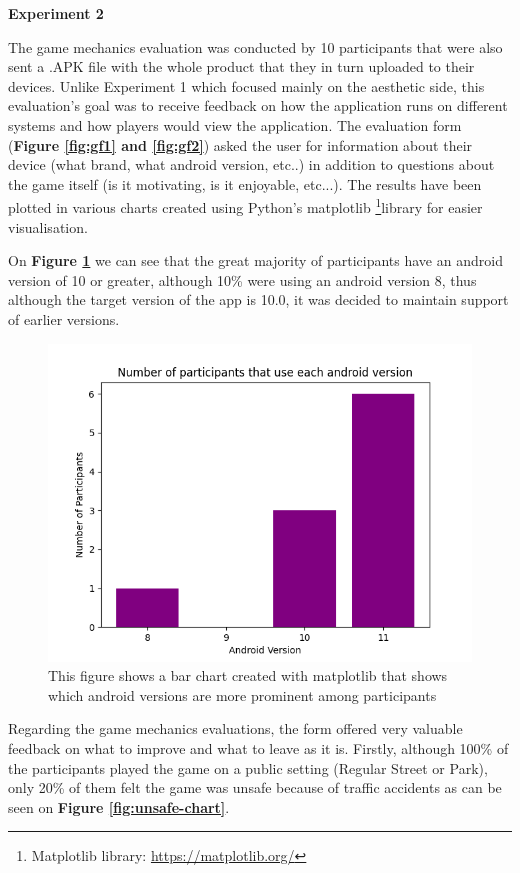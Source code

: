 \documentclass{dissertation}
\begin{document}
\textbf{Experiment 2}

The game mechanics evaluation was conducted by 10 participants that were also sent a .APK file with the whole product that they in turn uploaded to their devices. Unlike Experiment 1 which focused mainly on the aesthetic side, this evaluation's goal was to receive feedback on how the application runs on different systems and how players would view the application. The evaluation form (\textbf{Figure \ref{fig:gf1} and \ref{fig:gf2}}) asked the user for information about their device (what brand, what android version, etc..) in addition to questions about the game itself (is it motivating, is it enjoyable, etc...). The results have been plotted in various charts created using Python's matplotlib \footnote{Matplotlib library: \url{https://matplotlib.org/}}library for easier visualisation. 

On \textbf{Figure \ref{fig:android-version-chart}} we can see that the great majority of participants have an android version of 10 or greater, although 10\% were using an android version 8, thus although the target version of the app is 10.0, it was decided to maintain support of earlier versions.

\begin{figure}[H]
\centering
\includegraphics[width = 12cm]{images/android-version-chart.png}
\caption{This figure shows a bar chart created with matplotlib that shows which android versions are more prominent among participants}
\label{fig:android-version-chart}
\end{figure}

Regarding the game mechanics evaluations, the form offered very valuable feedback on what to improve and what to leave as it is. Firstly, although 100\% of the participants played the game on a public setting (Regular Street or Park), only 20\% of them felt the game was unsafe because of traffic accidents as can be seen on \textbf{Figure \ref{fig:unsafe-chart}}.
\end{document}
